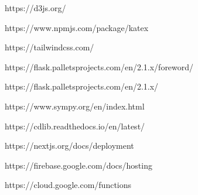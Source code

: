 \documentclass[a4paper,12pt]{report}
\begin{document}
\begin{thebibliography}{0}
https://d3js.org/

https://www.npmjs.com/package/katex

https://tailwindcss.com/

https://flask.palletsprojects.com/en/2.1.x/foreword/

https://flask.palletsprojects.com/en/2.1.x/

https://www.sympy.org/en/index.html

https://cdlib.readthedocs.io/en/latest/

https://nextjs.org/docs/deployment

https://firebase.google.com/docs/hosting

https://cloud.google.com/functions
%
\end{thebibliography}
% 
\end{document}
